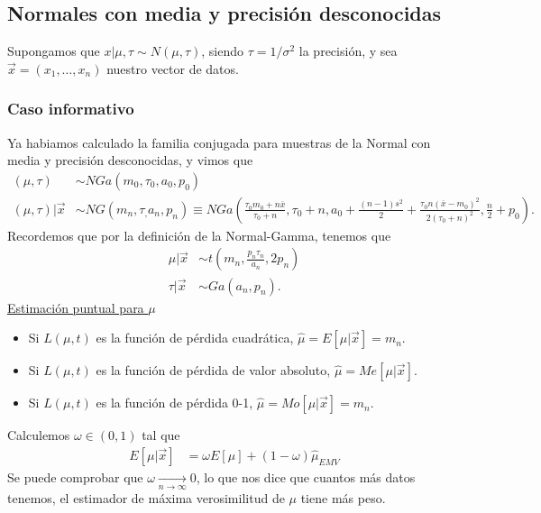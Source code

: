 \subsection{Normales con media y precisión desconocidas}
Supongamos que $x | \mu, \tau \sim N(\mu,\tau)$, siendo $\tau = 1/\sigma^2$ la precisión, y sea $\vec{x} = (x_1, \ldots, x_n)$ nuestro vector de datos.
\subsubsection{Caso informativo}
Ya habiamos calculado la familia conjugada para muestras de la Normal con media y precisión desconocidas, y vimos que
\begin{align*}
    (\mu,\tau)           & \sim NGa(m_0,\tau_0,a_0,p_0)                                                                                                                                                                                 \\
    (\mu,\tau) | \vec{x} & \sim NG(m_n,\tau_,a_n,p_n) \equiv NGa\left( \frac{\tau_0m_0 + n\overline{x}}{\tau_0 + n}, \tau_0+n, a_0 + \frac{(n-1)s^2}{2} + \frac{\tau_0n(\overline{x}-m_0)^2}{2(\tau_0+n)^2}, \frac{n}{2} + p_0 \right).
\end{align*}
Recordemos que por la definición de la Normal-Gamma, tenemos que
\begin{align*}
    \mu | \vec{x}  & \sim t\left(m_n, \frac{p_n\tau_n}{a_n}, 2p_n \right) \\
    \tau | \vec{x} & \sim Ga(a_n,p_n).
\end{align*}
\underline{Estimación puntual para $\mu$}
\begin{itemize}
    \item Si $L(\mu,t)$ es la función de pérdida cuadrática, $\widehat{\mu} = E[\mu |  \vec{x}] = m_n$.
    \item Si $L(\mu,t)$ es la función de pérdida de valor absoluto, $\widehat{\mu} = Me[\mu |  \vec{x}]$.
    \item Si $L(\mu,t)$ es la función de pérdida 0-1, $ \widehat{\mu} = Mo[\mu |  \vec{x}] = m_n$.
\end{itemize}
Calculemos $\omega \in (0,1)$ tal que
\begin{align*}
    E[\mu  | \vec{x}] & = \omega E[\mu]  + (1 - \omega) \widehat{\mu }_{EMV}
\end{align*}
Se puede comprobar que $\omega \xrightarrow[n \to \infty]{} 0$, lo que nos dice que cuantos más datos tenemos, el estimador de máxima verosimilitud de $\mu$ tiene más peso.

